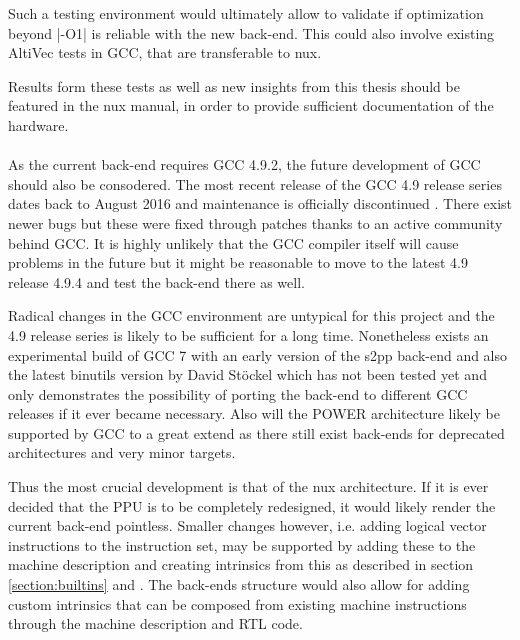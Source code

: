 Such a testing environment would ultimately allow to validate if optimization beyond |-O1| is reliable with the new back-end.
This could also involve existing AltiVec tests in GCC, that are transferable to nux.

Results form these tests as well as new insights from this thesis should be featured in the nux manual, in order to provide sufficient documentation of the hardware.
\\
\\
As the current back-end requires GCC 4.9.2, the future development of GCC should also be consodered.
The most recent release of the GCC 4.9 release series dates back to August 2016 and maintenance is officially discontinued \cite{https://gcc.gnu.org/gcc-4.9/}.
There exist newer bugs but these were fixed through patches thanks to an active community behind GCC.
It is highly unlikely that the GCC compiler itself will cause problems in the future but it might be reasonable to move to the latest 4.9 release 4.9.4 and test the back-end there as well.

Radical changes in the GCC environment are untypical for this project and the 4.9 release series is likely to be sufficient for a long time. 
Nonetheless exists an experimental build of GCC 7 with an early version of the s2pp back-end and also the latest binutils version by David Stöckel which has not been tested yet and only demonstrates the possibility of porting the back-end to different GCC releases if it ever became necessary.
Also will the POWER architecture likely be supported by GCC to a great extend as there still exist back-ends for deprecated architectures and very minor targets.

Thus the most crucial development is that of the nux architecture.
If it is ever decided that the  \ac{PPU} is to be completely redesigned, it would likely render the current back-end pointless.
Smaller changes however, i.e. adding logical vector instructions to the instruction set, may be supported by adding these to the machine description and creating intrinsics from this as described in section \ref{section:builtins} and \citep{heimbrecht}.
The back-ends structure would also allow for adding custom intrinsics that can be composed from existing machine instructions through the machine description and \ac{RTL} code.

